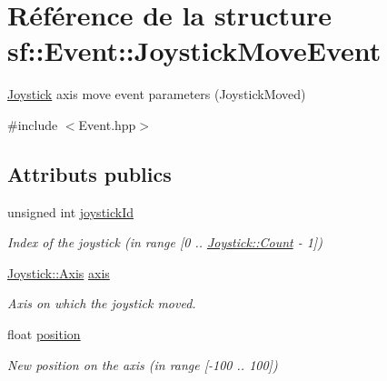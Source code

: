\hypertarget{structsf_1_1Event_1_1JoystickMoveEvent}{}\section{Référence de la structure sf\+:\+:Event\+:\+:Joystick\+Move\+Event}
\label{structsf_1_1Event_1_1JoystickMoveEvent}


\hyperlink{classsf_1_1Joystick}{Joystick} axis move event parameters (Joystick\+Moved)  




{\ttfamily \#include $<$Event.\+hpp$>$}

\subsection*{Attributs publics}
\begin{DoxyCompactItemize}
\item 
\mbox{\label{structsf_1_1Event_1_1JoystickMoveEvent_a7bf2b2f2941a21ed26a67c95f5e4232f}} 
unsigned int \hyperlink{structsf_1_1Event_1_1JoystickMoveEvent_a7bf2b2f2941a21ed26a67c95f5e4232f}{joystick\+Id}
\begin{DoxyCompactList}\small\item\em Index of the joystick (in range \mbox{[}0 .. \hyperlink{classsf_1_1Joystick_a951a7c775921304a5f3443c6e2bb4d65a6e0a2a95bc1da277610c04d80f52715e}{Joystick\+::\+Count} -\/ 1\mbox{]}) \end{DoxyCompactList}\item 
\mbox{\label{structsf_1_1Event_1_1JoystickMoveEvent_add22e8126b7974271991dc6380cbdee3}} 
\hyperlink{classsf_1_1Joystick_a48db337092c2e263774f94de6d50baa7}{Joystick\+::\+Axis} \hyperlink{structsf_1_1Event_1_1JoystickMoveEvent_add22e8126b7974271991dc6380cbdee3}{axis}
\begin{DoxyCompactList}\small\item\em Axis on which the joystick moved. \end{DoxyCompactList}\item 
\mbox{\label{structsf_1_1Event_1_1JoystickMoveEvent_aba5a70815420161375fd2e756689c32a}} 
float \hyperlink{structsf_1_1Event_1_1JoystickMoveEvent_aba5a70815420161375fd2e756689c32a}{position}
\begin{DoxyCompactList}\small\item\em New position on the axis (in range \mbox{[}-\/100 .. 100\mbox{]}) \end{DoxyCompactList}\end{DoxyCompactItemize}


